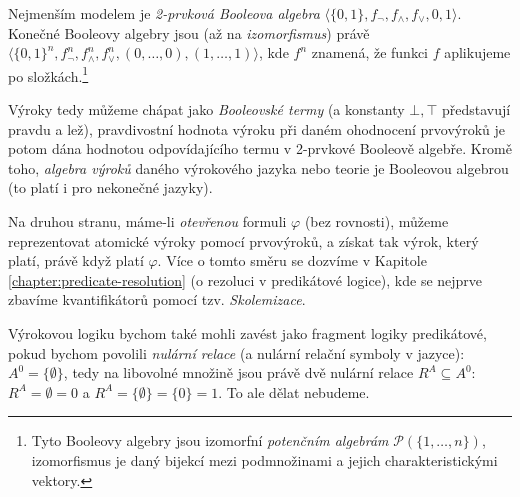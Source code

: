 \begin{definition}
\begin{multicols}{2}
\begin{itemize}
        \end{itemize}
    \end{multicols}
    Nejmenším modelem je \emph{2-prvková Booleova algebra} $\langle \{0,1\},f_\neg,f_\land,f_\lor,0,1\rangle$. Konečné Booleovy algebry jsou (až na \emph{izomorfismus}) právě $\langle \{0,1\}^n,f_\neg^n,f_\land^n,f_\lor^n,(0,\dots,0),(1,\dots,1)\rangle$, kde $f^n$ znamená, že funkci $f$ aplikujeme po složkách.\footnote{Tyto Booleovy algebry jsou izomorfní \emph{potenčním algebrám} $\mathcal P(\{1,\dots,n\})$, izomorfismus je daný bijekcí mezi podmnožinami a jejich charakteristickými vektory.}

    Výroky tedy můžeme chápat jako \emph{Booleovské termy} (a konstanty $\bot,\top$ představují pravdu a lež), pravdivostní hodnota výroku při daném ohodnocení prvovýroků je potom dána hodnotou odpovídajícího termu v 2-prvkové Booleově algebře.   Kromě toho, \emph{algebra výroků} daného výrokového jazyka nebo teorie je Booleovou algebrou (to platí i pro nekonečné jazyky).

    Na druhou stranu, máme-li \emph{otevřenou} formuli $\varphi$ (bez rovnosti), můžeme reprezentovat atomické výroky pomocí prvovýroků, a získat tak výrok, který platí, právě když platí $\varphi$. Více o tomto směru se dozvíme v Kapitole \ref{chapter:predicate-resolution} (o rezoluci v predikátové logice), kde se nejprve zbavíme kvantifikátorů pomocí tzv. \emph{Skolemizace}.

    Výrokovou logiku bychom také mohli zavést jako fragment logiky predikátové, pokud bychom povolili \emph{nulární relace} (a nulární relační symboly v jazyce): $A^0=\{\emptyset\}$, tedy na libovolné množině jsou právě dvě nulární relace $R^A\subseteq A^0$: $R^A=\emptyset=0$ a $R^A=\{\emptyset\}=\{0\}=1$. To ale dělat nebudeme. 
    
\end{definition}

